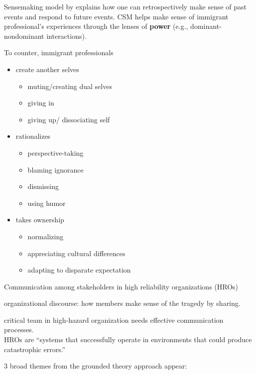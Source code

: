 \documentclass[
]{book}
\providecommand{\tightlist}{%
  \setlength{\itemsep}{0pt}\setlength{\parskip}{0pt}}
\begin{document}
Sensemaking model by \citep{Weick_1995} explains how one can retrospectively make sense of past events and respond to future
events. CSM helps make sense of immigrant professional's experiences through the lenses of \textbf{power} (e.g.,
dominant-nondominant interactions).

To counter, immigrant professionals

\begin{itemize}
\item
  create another selves

  \begin{itemize}
  \tightlist
  \item
    muting/creating dual selves
  \item
    giving in
  \item
    giving up/ dissociating self
  \end{itemize}
\item
  rationalizes

  \begin{itemize}
  \tightlist
  \item
    perspective-taking
  \item
    blaming ignorance
  \item
    dismissing
  \item
    using humor
  \end{itemize}
\item
  takes ownership

  \begin{itemize}
  \tightlist
  \item
    normalizing
  \item
    appreciating cultural differences
  \item
    adapting to disparate expectation
  \end{itemize}
\end{itemize}

\citep{Williams_2017}

Communication among stakeholders in high reliability organizations (HROs)

organizational discourse: how members make sense of the tragedy by sharing.

critical team in high-hazard organization needs effective communication processes.\\
HROs are ``systems that successfully operate in environments that could produce catastrophic errors.''

3 broad themes from the grounded theory approach appear:
\end{document}
